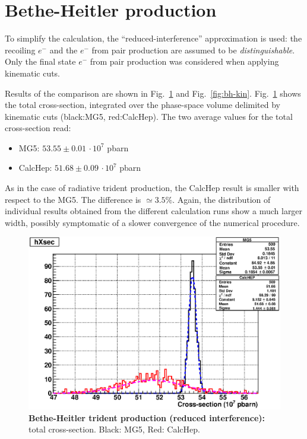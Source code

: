\documentclass{article}
\begin{document}
\section{Bethe-Heitler production}
To simplify the calculation, the ``reduced-interference'' approximation is used: the recoiling $e^-$ and the $e^-$ from pair production are assumed to be \textit{distinguishable}. Only the final state $e^-$ from pair production was considered when applying kinematic cuts.


Results of the comparison are shown in Fig.~\ref{fig:bh-xsec} and Fig.~\ref{fig:bh-kin}. Fig.~\ref{fig:bh-xsec} shows the total cross-section, integrated over the phase-space volume delimited by kinematic cuts (black:MG5, red:CalcHep). The two average values for the total cross-section read:
\begin{itemize}
\item MG5: $53.55\pm0.01 \, \cdot 10^7$ pbarn
\item CalcHep: $51.68\pm0.09 \, \cdot 10^7$ pbarn
\end{itemize}
As in the case of radiative trident production, the CalcHep result is smaller with respect to the MG5. The difference is $\simeq 3.5\%$. Again, the distribution of individual results obtained from the different calculation runs show a much larger width, possibly symptomatic of a slower convergence of the numerical procedure.


\begin{figure}[tpb]
\centering
\includegraphics[width=.8\textwidth]{img/BH_xsec.eps}
\caption{\label{fig:bh-xsec} \textbf{Bethe-Heitler trident production (reduced interference):} total cross-section. Black: MG5, Red: CalcHep.}
\end{figure}
\end{document}
